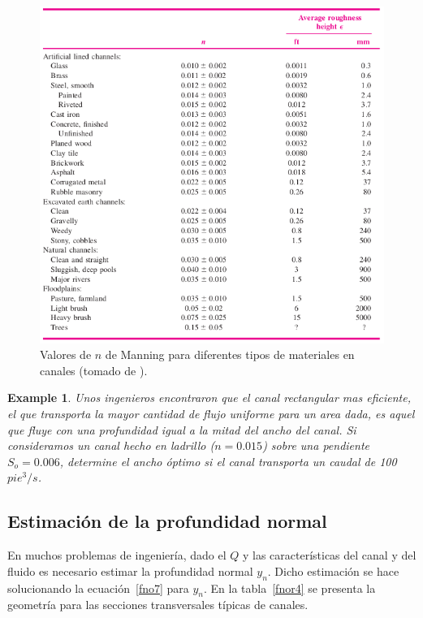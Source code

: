 \documentclass[11pt, oneside]{article}
\newtheorem{exa}{Example}
\begin{document}
\begin{figure}[h]
\centering
\includegraphics[width=\textwidth]{fnor3.png}
\caption{Valores de $n$ de Manning para diferentes tipos de materiales en canales (tomado de \cite{white1990fluid}).}
\label{fnor3}
\end{figure}

\begin{shaded}
\begin{exa}
Unos ingenieros encontraron que el canal rectangular mas eficiente, el que transporta la mayor cantidad de flujo uniforme para un area dada, es aquel que fluye con una profundidad igual a la mitad del ancho del canal. Si consideramos un canal hecho en ladrillo ($n=0.015$) sobre una pendiente $S_o = 0.006$, determine el ancho \'optimo si el canal transporta un caudal de 100 $pie^3 /s$.
\end{exa}
\end{shaded}




\subsection{Estimaci\'on de la profundidad normal}\label{normProf}
En muchos problemas de ingenier\'ia, dado el $Q$ y las caracter\'isticas del canal y del fluido es necesario estimar la profundidad normal $y_n$. Dicho estimaci\'on se hace solucionando la ecuaci\'on~\ref{fno7} para $y_n$. En la tabla~\ref{fnor4} se presenta la geometr\'ia para las secciones transversales t\'ipicas de canales.
\end{document}
